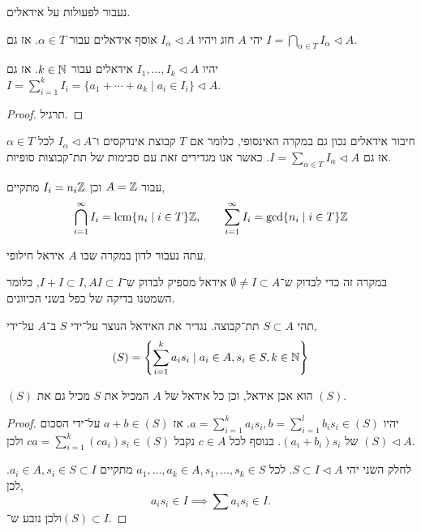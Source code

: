 נעבור לפעולות על אידאלים.
\begin{proposition}
	יהי $A$ חוג ויהיו $I_{\alpha} \triangleleft  A$ אוסף אידאלים עבור $\alpha \in T$.
	אז גם $I = \bigcap_{\alpha \in T} I_{\alpha} \triangleleft A$.
\end{proposition}
\begin{proposition}
	יהיו $I_1, \ldots, I_k \triangleleft A$ אידאלים עבור $k \in \mathbb{N}$.
	אז גם $I = \sum_{i = 1}^k I_i = \{ a_1 + \cdots + a_k \mid a_i \in I_i \} \triangleleft A$.
\end{proposition}
\begin{proof}
	תרגיל.
\end{proof}
\begin{proposition}
	חיבור אידאלים נכון גם במקרה האינסופי, כלומר אם $T$ קבוצת אינדקסים ו־$I_{\alpha} \triangleleft A$ לכל $\alpha \in T$ אז גם $I = \sum_{\alpha \in T} I_{\alpha} \triangleleft A$.
	כאשר אנו מגדירים זאת עם סכימות של תת־קבוצות סופיות.
\end{proposition}
\begin{example}
	עבור $A = \mathbb{Z}$ וכן $I_i = n_i \mathbb{Z}$ מתקיים,
	\[
		\bigcap_{i = 1}^\infty I_i = \operatorname{lcm}\{ n_i \mid i \in T \} \mathbb{Z},
		\qquad
		\sum_{i = 1}^\infty I_i = \gcd\{ n_i \mid i \in T \} \mathbb{Z}
	\]
\end{example}
עתה נעבור לדון במקרה שבו $A$ אידאל חילופי.
\begin{remark}
	במקרה זה כדי לבדוק ש־$\emptyset \ne I \subset A$ אידאל מספיק לבדוק ש־$I + I \subset I, A I \subset I$, כלומר השמטנו בדיקה של כפל בשני הכיוונים.
\end{remark}
\begin{definition}
	תהי $S \subset A$ תת־קבוצה.
	נגדיר את האידאל הנוצר על־ידי $S$ ב־$A$ על־ידי,
	\[
		(S)
		= \left\{ \sum_{i = 1}^k a_i s_i \mid a_i \in A, s_i \in S, k \in \mathbb{N} \right\}
	\]
\end{definition}
\begin{proposition}
	$(S)$ הוא אכן אידאל, וכן כל אידאל של $A$ המכיל את $S$ מכיל גם את $(S)$.
\end{proposition}
\begin{proof}
	יהיו $a = \sum_{i = 1}^k a_i s_i, b = \sum_{i = 1}^l b_i s_i \in (S)$.
	אז $a + b \in (S)$ על־ידי הסכום של $(a_i + b_i) s_i$.
	בנוסף לכל $c \in A$ נקבל $c a = \sum_{i = 1}^k (c a_i) s_i \in (S)$ ולכן $(S) \triangleleft A$.

	לחלק השני יהי $S \subset I \triangleleft A$.
	לכל $a_1, \ldots, a_k \in A, s_1, \ldots, s_k \in S$ מתקיים $a_i \in A, s_i \in S \subset I$.
	לכן,
	\[
		a_i s_i \in I
		\implies \sum a_i s_i \in I
	.\]
	ולכן נובע ש־$(S) \subset I$.
\end{proof}
